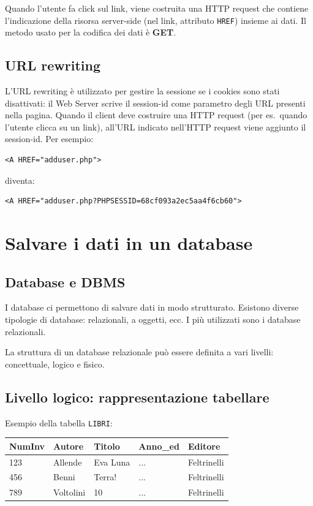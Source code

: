 Quando l'utente fa click sul link, viene costruita una HTTP request che contiene l'indicazione della risorsa server-side (nel link, attributo \texttt{HREF}) insieme ai dati. Il metodo usato per la codifica dei dati è \textbf{GET}.

\subsection{URL rewriting}

L'URL rewriting è utilizzato per gestire la sessione se i cookies sono stati disattivati: il Web Server scrive il session-id come parametro degli URL presenti nella pagina. Quando il client deve costruire una HTTP request (per es.\ quando l'utente clicca su un link), all'URL indicato nell'HTTP request viene aggiunto il session-id. Per esempio:

\begin{lstlisting}[language=HTML5]
<A HREF="adduser.php">
\end{lstlisting}

diventa:

\begin{lstlisting}[language=HTML5]
<A HREF="adduser.php?PHPSESSID=68cf093a2ec5aa4f6cb60">
\end{lstlisting}

\section{Salvare i dati in un database}

\subsection{Database e DBMS}

I database ci permettono di salvare dati in modo strutturato. Esistono diverse tipologie di database: relazionali, a oggetti, ecc. I più utilizzati sono i database relazionali.

La struttura di un database relazionale può essere definita a vari livelli: concettuale, logico e fisico.

\subsection{Livello logico: rappresentazione tabellare}

Esempio della tabella \texttt{LIBRI}:

\begin{center}
\begin{tabular}{|l|l|l|l|l|}
\hline
NumInv & Autore & Titolo & Anno\_ed & Editore \\
\hline
123 & Allende & Eva Luna & ... & Feltrinelli \\
456 & Benni & Terra! & ... & Feltrinelli \\
789 & Voltolini & 10 & ... & Feltrinelli \\
\hline
\end{tabular}
\end{center}

